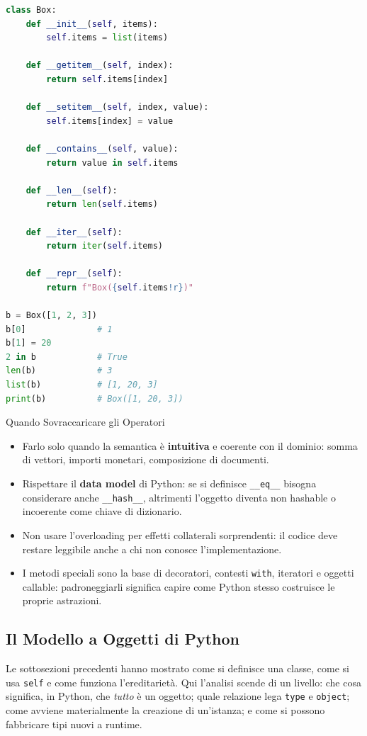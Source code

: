 \documentclass[12pt]{extarticle}
\begin{document}
\begin{lstlisting}[language=Python]
class Box:
    def __init__(self, items):
        self.items = list(items)

    def __getitem__(self, index):
        return self.items[index]

    def __setitem__(self, index, value):
        self.items[index] = value

    def __contains__(self, value):
        return value in self.items

    def __len__(self):
        return len(self.items)

    def __iter__(self):
        return iter(self.items)

    def __repr__(self):
        return f"Box({self.items!r})"

b = Box([1, 2, 3])
b[0]              # 1
b[1] = 20
2 in b            # True
len(b)            # 3
list(b)           # [1, 20, 3]
print(b)          # Box([1, 20, 3])
\end{lstlisting}

\begin{cbox}{Quando Sovraccaricare gli Operatori}
\begin{itemize}
    \item Farlo solo quando la semantica è \textbf{intuitiva} e coerente con il dominio: somma di vettori, importi monetari, composizione di documenti.
    \item Rispettare il \textbf{data model} di Python: se si definisce \texttt{\_\_eq\_\_} bisogna considerare anche \texttt{\_\_hash\_\_}, altrimenti l'oggetto diventa non hashable o incoerente come chiave di dizionario.
    \item Non usare l'overloading per effetti collaterali sorprendenti: il codice deve restare leggibile anche a chi non conosce l'implementazione.
    \item I metodi speciali sono la base di decoratori, contesti \texttt{with}, iteratori e oggetti callable: padroneggiarli significa capire come Python stesso costruisce le proprie astrazioni.
\end{itemize}
\end{cbox}

\clearpage
\normalsize

\subsection{Il Modello a Oggetti di Python}

\noindent Le sottosezioni precedenti hanno mostrato come si definisce una classe, come si usa \texttt{self} e come funziona l'ereditarietà. Qui l'analisi scende di un livello: che cosa significa, in Python, che \emph{tutto} è un oggetto; quale relazione lega \texttt{type} e \texttt{object}; come avviene materialmente la creazione di un'istanza; e come si possono fabbricare tipi nuovi a runtime.
\end{document}
